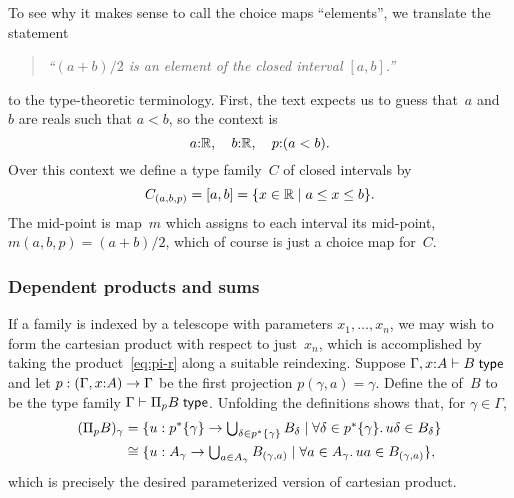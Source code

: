 \begin{example}
  To see why it makes sense to call the choice maps ``elements'',
  we translate the statement
  \begin{quote}
    \emph{``$(a + b)/2$ is an element of the closed interval $[a,b]$.''}
  \end{quote}
  to the type-theoretic terminology. First, the text expects us to guess that~$a$ and~$b$ are reals such that $a < b$, so the context is
  \begin{equation*}
    a {:} \mathbb{R},\quad b {:} \mathbb{R},\quad p {:} (a < b).
  \end{equation*}
  Over this context we define a type family~$C$ of closed intervals by
  \begin{equation*}
    C_{(a, b, p)} = [a, b] = \{x \in \mathbb{R} \mid a \leq x \leq b\}.
  \end{equation*}
  The mid-point is map~$m$ which assigns to each interval its mid-point, $m(a, b, p) = (a + b)/2$, which of course is just a choice map for~$C$.
\end{example}

\subsubsection{Dependent products and sums}
\label{sec:depend-sums-prod-in-sets}

If a family is indexed by a telescope with parameters $x_1, \ldots, x_n$, we may wish to form the cartesian product with respect to just~$x_n$,
which is accomplished by taking the product~\eqref{eq:pi-r} along a suitable reindexing.
%
Suppose $\Gamma, x {:} A \vdash B \;\mathsf{type}$ and let $p : (\Gamma, x {:} A) \to \Gamma$ be the first projection $p(\gamma, a) = \gamma$.
%
Define the  of~$B$ to be the type family $\Gamma \vdash \Pi_p B \;\mathsf{type}$.
Unfolding the definitions shows that, for $\gamma \in \Gamma$,
%
\begin{align*}
  (\Pi_p B)_\gamma &=
  \{ u : p^{*} \{\gamma\} \to
        \textstyle\bigcup_{\delta \in p^{*} \{\gamma\}} B_\delta
    \mid \forall \delta \in p^{*} \{\gamma\} .\, u \delta \in B_\delta
  \} \\
  &\cong
  \{ u : A_\gamma \to
        \textstyle\bigcup_{a \in A_\gamma} B_{(\gamma, a)}
    \mid \forall a \in A_\gamma .\, u a \in B_{(\gamma, a)}
  \},
\end{align*}
%
which is precisely the desired parameterized version of cartesian product.

